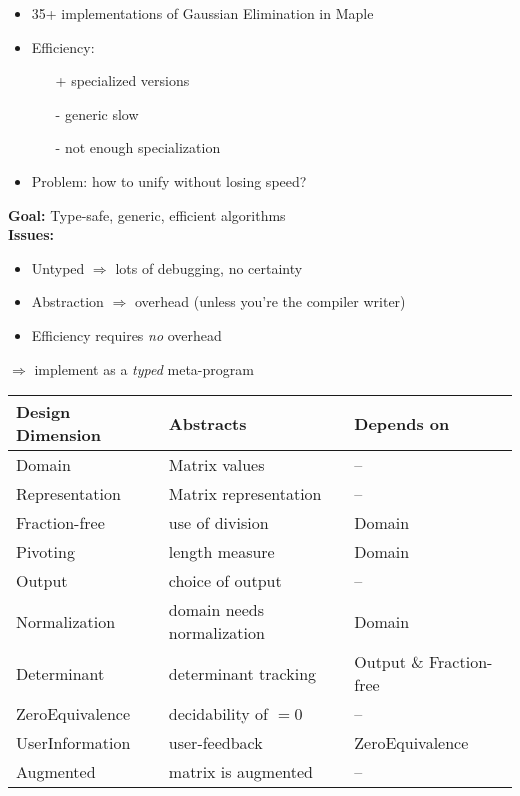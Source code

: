 \documentclass[landscape]{slides}
\begin{document}
\begin{slide}
    \begin{itemize}
        \item 35+ implementations of Gaussian Elimination in Maple
        \item Efficiency:
            \begin{itemize}
                \item[+] specialized versions 
                \item[-] generic slow
                \item[-] not enough specialization
            \end{itemize}
        \item Problem: how to unify without losing speed?
    \end{itemize}
\end{slide}

\begin{slide}
    \textbf{Goal:} Type-safe, generic, efficient algorithms\\
    \textbf{Issues:}
    \begin{itemize}
        \item Untyped $\Rightarrow$ lots of debugging, no certainty\vsii
        \item Abstraction $\Rightarrow$ overhead 
            (unless you're the compiler writer)\vsii
        \item Efficiency requires \emph{no} overhead\vsi
    \end{itemize}
    $\Longrightarrow$ implement as a \emph{typed} meta-program
\end{slide}

\begin{slide}
    \hspace*{-2cm}
        \begin{tabular}{|l|l|l|} \hline
        Design Dimension & Abstracts & Depends on \\ \hline
        Domain & Matrix values & -- \\ \hline
        Representation & Matrix representation & -- \\ \hline
        Fraction-free & use of division & Domain \\ \hline
        Pivoting & length measure & Domain \\ \hline
        Output & choice of output & -- \\ \hline
        Normalization & domain needs normalization & Domain \\ \hline
        Determinant & determinant tracking & Output \& Fraction-free \\ \hline
        ZeroEquivalence & decidability of $=0$ & -- \\ \hline
        UserInformation & user-feedback & ZeroEquivalence\\ \hline
        Augmented & matrix is augmented & -- \\ \hline
    \end{tabular}
\end{slide}
\end{document}
